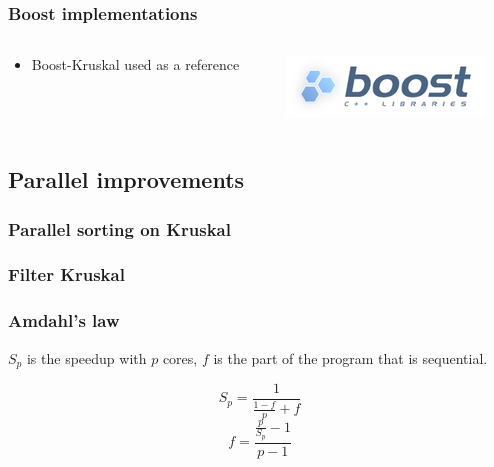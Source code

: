 \documentclass{beamer}
\begin{document}
\begin{frame}
\frametitle{Boost implementations}

\begin{columns}
\begin{column}{.7\linewidth}
\begin{itemize}
\item Boost-Kruskal used as a reference
\end{itemize}
\end{column}

\begin{column}{.3\linewidth}
\includegraphics[width=\linewidth]{boost.png}
\end{column}
\end{columns}

\end{frame}



\subsection{Parallel improvements}

\begin{frame}
\frametitle{Parallel sorting on Kruskal}

\end{frame}

\begin{frame}

	\frametitle{Filter Kruskal}

\end{frame}

\begin{frame}
    \frametitle{Amdahl's law}

	$S_p$ is the speedup with $p$ cores, $f$ is the part of the program that is sequential.

	\[
		S_p = \frac{1}{\frac{1-f}{p} + f}
	\]
	\[
		f = \frac{\frac{p}{S_p} - 1}{p - 1}
	\]

\end{frame}
\end{document}
